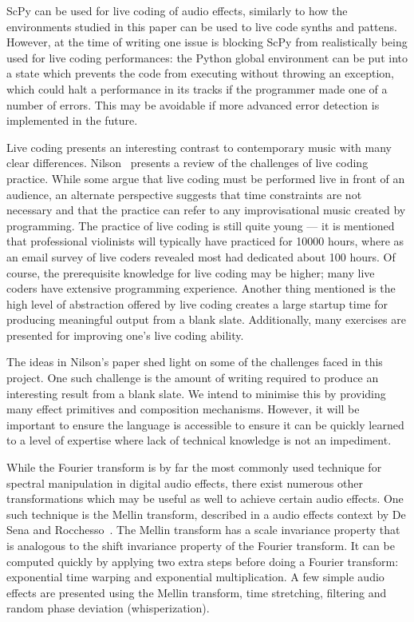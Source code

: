 \documentclass{article}
\begin{document}
ScPy can be used for live coding of audio effects, similarly to how the environments studied in
this paper can be used to live code synths and pattens. However, at the time of writing one issue
is blocking ScPy from realistically being used for live coding performances: the Python global
environment can be put into a state which prevents the code from executing without throwing an
exception, which could halt a performance in its tracks if the programmer made one of a number of
errors. This may be avoidable if more advanced error detection is implemented in the future.

Live coding presents an interesting contrast to contemporary music with many clear differences.
Nilson~\cite{nilson2007live} presents a review of the challenges of live coding
practice. While some argue that live coding must be performed live in front of an
audience, an alternate perspective suggests that time constraints are not necessary and that the
practice can refer to any improvisational music created by programming. The practice of live coding
is still quite young --- it is mentioned that professional violinists will typically have practiced
for 10000 hours, where as an email survey of live coders revealed most had dedicated about 100
hours. Of course, the prerequisite knowledge for live coding may be higher; many live coders have
extensive programming experience. Another thing mentioned is the high level of abstraction offered
by live coding creates a large startup time for producing meaningful output from a blank slate.
Additionally, many exercises are presented for improving one's live coding ability.

The ideas in Nilson's paper shed light on some of the challenges faced in this project.
One such challenge is the amount of writing required to produce an interesting result from a blank
slate. We intend to minimise this by providing many effect primitives and composition
mechanisms. However, it will be important to ensure the language is accessible to ensure it can be
quickly learned to a level of expertise where lack of technical knowledge is not an impediment.

While the Fourier transform is by far the most commonly used technique for spectral manipulation in
digital audio effects, there exist numerous other transformations which may be useful as well to
achieve certain audio effects. One such technique is the Mellin transform, described in a audio
effects context by De Sena and Rocchesso~\cite{de2004fast}. The Mellin transform has a scale
invariance property that is analogous to the shift invariance property of the Fourier transform. It
can be computed quickly by applying two extra steps before doing a Fourier transform: exponential
time warping and exponential multiplication. A few simple audio effects are presented using the
Mellin transform, time stretching, filtering and random phase deviation (whisperization).
\end{document}
